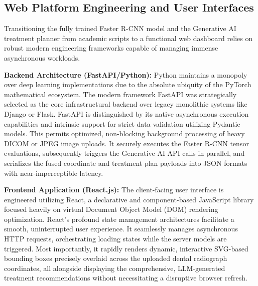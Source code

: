\subsection{Web Platform Engineering and User Interfaces}
\par Transitioning the fully trained Faster R-CNN model and the Generative AI treatment planner from academic scripts to a functional web dashboard relies on robust modern engineering frameworks capable of managing immense asynchronous workloads.
\par \textbf{Backend Architecture (FastAPI/Python):} Python maintains a monopoly over deep learning implementations due to the absolute ubiquity of the PyTorch mathematical ecosystem. The modern framework FastAPI was strategically selected as the core infrastructural backend over legacy monolithic systems like Django or Flask. FastAPI is distinguished by its native asynchronous execution capabilities and intrinsic support for strict data validation utilizing Pydantic models. This permits optimized, non-blocking background processing of heavy DICOM or JPEG image uploads. It securely executes the Faster R-CNN tensor evaluations, subsequently triggers the Generative AI API calls in parallel, and serializes the fused coordinate and treatment plan payloads into JSON formats with near-imperceptible latency.
\par \textbf{Frontend Application (React.js):} The client-facing user interface is engineered utilizing React, a declarative and component-based JavaScript library focused heavily on virtual Document Object Model (DOM) rendering optimization. React's profound state management architectures facilitate a smooth, uninterrupted user experience. It seamlessly manages asynchronous HTTP requests, orchestrating loading states while the server models are triggered. Most importantly, it rapidly renders dynamic, interactive SVG-based bounding boxes precisely overlaid across the uploaded dental radiograph coordinates, all alongside displaying the comprehensive, LLM-generated treatment recommendations without necessitating a disruptive browser refresh.

